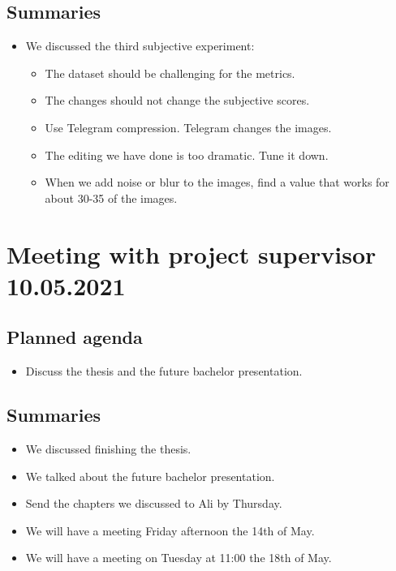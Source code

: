\subsection*{Summaries}
\begin{itemize}
    \item We discussed the third subjective experiment:
    \begin{itemize}
        \item The dataset should be challenging for the metrics.
        \item The changes should not change the subjective scores.
        \item Use Telegram compression. Telegram changes the images.
        \item The editing we have done is too dramatic. Tune it down.
        \item When we add noise or blur to the images, find a value that works for about 30-35 of the images.
    \end{itemize}
\end{itemize}

\newpage

\section*{Meeting with project supervisor 10.05.2021}
\subsection*{Planned agenda}
\begin{itemize}
    \item Discuss the thesis and the future bachelor presentation.
\end{itemize}

\subsection*{Summaries}
\begin{itemize}
    \item We discussed finishing the thesis.
    \item We talked about the future bachelor presentation.
    \item Send the chapters we discussed to Ali by Thursday.
    \item We will have a meeting Friday afternoon the 14th of May.
    \item We will have a meeting on Tuesday at 11:00 the 18th of May.
\end{itemize}
